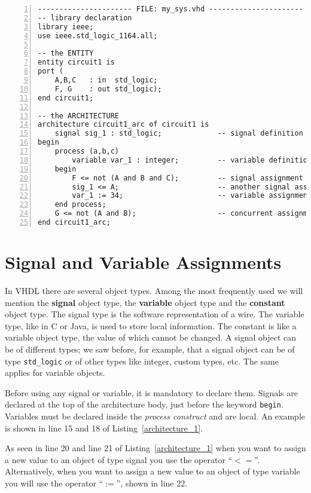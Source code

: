 \begin{lstlisting}[float, numbers=left, label=architecture_1, caption=Example of a simple VHDL block.]
---------------------- FILE: my_sys.vhd ----------------------
-- library declaration
library ieee;
use ieee.std_logic_1164.all;

-- the ENTITY
entity circuit1 is
port (
    A,B,C   : in  std_logic;
    F, G    : out std_logic);
end circuit1;

-- the ARCHITECTURE
architecture circuit1_arc of circuit1 is
	signal sig_1 : std_logic;             -- signal definition
begin
    process (a,b,c)
        variable var_1 : integer;         -- variable definition
    begin
        F <= not (A and B and C);         -- signal assignment
	    sig_1 <= A;                       -- another signal assignment
	    var_1 := 34;                      -- variable assignment
    end process;
    G <= not (A and B);                   -- concurrent assignment
end circuit1_arc;
\end{lstlisting}

\section{Signal and Variable Assignments}
In VHDL there are several object types. Among the most frequently used we will mention the \textbf{signal} object type, the \textbf{variable} object type and the \textbf{constant} object type. The signal type is the software representation of a wire. The variable type, like in C or Java, is used to store local information. The constant is like a variable object type, the value of which cannot be changed. A signal object can be of different types; we saw before, for example, that a signal object can be of type \texttt{std\_logic} or of other types like integer, custom types, etc. The same applies for variable objects.

Before using any signal or variable, it is mandatory to declare them. Signals are declared at the top of the architecture body, just before the keyword \texttt{begin}. Variables must be declared inside the \textit{process construct} and are local. An example is shown in line 15 and 18 of Listing~\ref{architecture_1}.

As seen in line 20 and line 21 of Listing~\ref{architecture_1} when you want to assign a new value to an object of type signal you use the operator ``$<=$''. Alternatively, when you want to assign a new value to an object of type variable you will use the operator ``$:=$'', shown in line 22.

